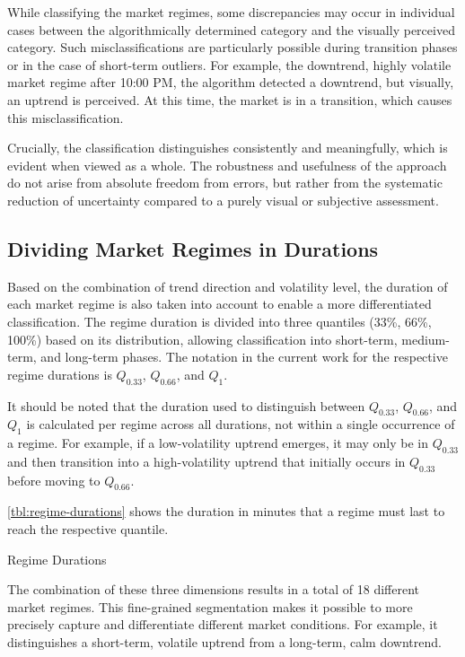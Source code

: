 \noindent
While classifying the market regimes, some discrepancies may occur in individual cases between the algorithmically determined category and the visually perceived category.
Such misclassifications are particularly possible during transition phases or in the case of short-term outliers.
For example, the downtrend, highly volatile market regime after 10:00 PM, the algorithm detected a downtrend, but visually, an uptrend is perceived.
At this time, the market is in a transition, which causes this misclassification.

Crucially, the classification distinguishes consistently and meaningfully, which is evident when viewed as a whole.
The robustness and usefulness of the approach do not arise from absolute freedom from errors, but rather from the systematic reduction of uncertainty compared to a purely visual or subjective assessment.

\subsection{Dividing Market Regimes in Durations}

Based on the combination of trend direction and volatility level, the duration of each market regime is also taken into account to enable a more differentiated classification.
The regime duration is divided into three quantiles (33\%, 66\%, 100\%) based on its distribution, allowing classification into short-term, medium-term, and long-term phases.
The notation in the current work for the respective regime durations is $Q_{0.33}$, $Q_{0.66}$, and $Q_{1}$.

It should be noted that the duration used to distinguish between $Q_{0.33}$, $Q_{0.66}$, and $Q_{1}$ is calculated per regime across all durations, not within a single occurrence of a regime.
For example, if a low-volatility uptrend emerges, it may only be in $Q_{0.33}$ and then transition into a high-volatility uptrend that initially occurs in $Q_{0.33}$ before moving to $Q_{0.66}$.

\autoref{tbl:regime-durations} shows the duration in minutes that a regime must last to reach the respective quantile.


\begin{table}[H]
    \centering
    
    \caption{Regime Durations}
    \label{tbl:regime-durations}
\end{table}

\noindent
The combination of these three dimensions results in a total of 18 different market regimes.
This fine-grained segmentation makes it possible to more precisely capture and differentiate different market conditions.
For example, it distinguishes a short-term, volatile uptrend from a long-term, calm downtrend.

